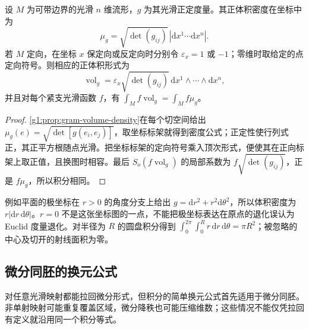 \begin{proposition}
	\label{g1:prop:metric-volume-integration}
	设 \(M\) 为可带边界的光滑 \(n\) 维流形，\(g\) 为其光滑正定度量。其正体积密度在坐标中为
	\[
		\mu_g=\sqrt{\det(g_{ij})}\,|\mathrm{d}x^1\cdots\mathrm{d}x^n|.
	\]
	若 \(M\) 定向，在坐标 \(x\) 保定向或反定向时分别令 \(\varepsilon_x=1\) 或 \(-1\)；零维时取给定的点定向符号。则相应的正体积形式为
	\[
		\operatorname{vol}_g=\varepsilon_x\sqrt{\det(g_{ij})}\,\mathrm{d}x^1\wedge\cdots\wedge\mathrm{d}x^n,
	\]
	并且对每个紧支光滑函数 \(f\)，有 \(\int_M f\operatorname{vol}_g=\int_M f\mu_g\)。
\end{proposition}
\begin{proof}
	\cref{g1:prop:gram-volume-density}在每个切空间给出 \(\mu_g(e)=\sqrt{\det[g(e_i,e_j)]}\)，取坐标标架就得到密度公式；正定性使行列式正，其正平方根随点光滑。把坐标标架的定向符号乘入顶次形式，便使其在正向标架上取正值，且换图时相容。最后 \(S_o(f\operatorname{vol}_g)\) 的局部系数为 \(f\sqrt{\det(g_{ij})}\)，正是 \(f\mu_g\)，所以积分相同。
\end{proof}

例如平面的极坐标在 \(r>0\) 的角度分支上给出 \(g=\mathrm{d}r^2+r^2\mathrm{d}\theta^2\)，所以体积密度为 \(r|\mathrm{d}r\,\mathrm{d}\theta|\)。\(r=0\) 不是这张坐标图的一点，不能把极坐标表达在原点的退化误认为 Euclid 度量退化。对半径为 \(R\) 的圆盘积分得到 \(\int_0^{2\pi}\int_0^R r\,\mathrm{d}r\,\mathrm{d}\theta=\pi R^2\)；被忽略的中心及切开的射线面积为零。

\subsection{微分同胚的换元公式}
\label{g1:subsec:1403:05}

对任意光滑映射都能拉回微分形式，但积分的简单换元公式首先适用于微分同胚。非单射映射可能重复覆盖区域，微分降秩也可能压缩维数；这些情况不能仅凭拉回有定义就沿用同一个积分等式。

